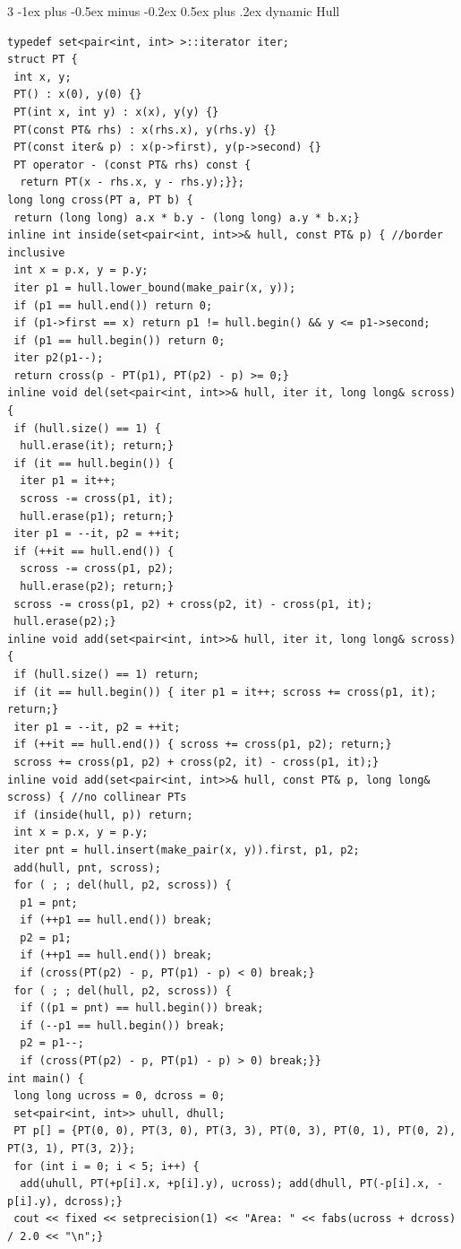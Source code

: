 \documentclass[8pt,a4paper,onesided]{article}
\makeatletter
\renewcommand{\subsection}{\@startsection{subsection}{2}{0mm}
    {-1ex plus -0.5ex minus -0.2ex} %
    {0.5ex plus .2ex}                %
    {\normalfont\large\bfseries}}    %
\makeatother
\begin{document}
\begin{multicols}{3}
\subsection{dynamic Hull}
\begin{verbatim}
typedef set<pair<int, int> >::iterator iter;
struct PT {
 int x, y;
 PT() : x(0), y(0) {}
 PT(int x, int y) : x(x), y(y) {}
 PT(const PT& rhs) : x(rhs.x), y(rhs.y) {}
 PT(const iter& p) : x(p->first), y(p->second) {}
 PT operator - (const PT& rhs) const {
  return PT(x - rhs.x, y - rhs.y);}};
long long cross(PT a, PT b) {
 return (long long) a.x * b.y - (long long) a.y * b.x;}
inline int inside(set<pair<int, int>>& hull, const PT& p) { //border inclusive
 int x = p.x, y = p.y;
 iter p1 = hull.lower_bound(make_pair(x, y));
 if (p1 == hull.end()) return 0;
 if (p1->first == x) return p1 != hull.begin() && y <= p1->second;
 if (p1 == hull.begin()) return 0;
 iter p2(p1--);
 return cross(p - PT(p1), PT(p2) - p) >= 0;}
inline void del(set<pair<int, int>>& hull, iter it, long long& scross) {
 if (hull.size() == 1) {
  hull.erase(it); return;}
 if (it == hull.begin()) {
  iter p1 = it++;
  scross -= cross(p1, it);
  hull.erase(p1); return;}
 iter p1 = --it, p2 = ++it;
 if (++it == hull.end()) {
  scross -= cross(p1, p2);
  hull.erase(p2); return;}
 scross -= cross(p1, p2) + cross(p2, it) - cross(p1, it);
 hull.erase(p2);}
inline void add(set<pair<int, int>>& hull, iter it, long long& scross) {
 if (hull.size() == 1) return;
 if (it == hull.begin()) { iter p1 = it++; scross += cross(p1, it); return;}
 iter p1 = --it, p2 = ++it;
 if (++it == hull.end()) { scross += cross(p1, p2); return;}
 scross += cross(p1, p2) + cross(p2, it) - cross(p1, it);}
inline void add(set<pair<int, int>>& hull, const PT& p, long long& scross) { //no collinear PTs
 if (inside(hull, p)) return;
 int x = p.x, y = p.y;
 iter pnt = hull.insert(make_pair(x, y)).first, p1, p2;
 add(hull, pnt, scross);
 for ( ; ; del(hull, p2, scross)) {
  p1 = pnt;
  if (++p1 == hull.end()) break;
  p2 = p1;
  if (++p1 == hull.end()) break;
  if (cross(PT(p2) - p, PT(p1) - p) < 0) break;}
 for ( ; ; del(hull, p2, scross)) {
  if ((p1 = pnt) == hull.begin()) break;
  if (--p1 == hull.begin()) break;
  p2 = p1--;
  if (cross(PT(p2) - p, PT(p1) - p) > 0) break;}}
int main() {
 long long ucross = 0, dcross = 0;
 set<pair<int, int>> uhull, dhull;
 PT p[] = {PT(0, 0), PT(3, 0), PT(3, 3), PT(0, 3), PT(0, 1), PT(0, 2), PT(3, 1), PT(3, 2)};
 for (int i = 0; i < 5; i++) {
  add(uhull, PT(+p[i].x, +p[i].y), ucross); add(dhull, PT(-p[i].x, -p[i].y), dcross);}
 cout << fixed << setprecision(1) << "Area: " << fabs(ucross + dcross) / 2.0 << "\n";}
\end{verbatim}

\end{multicols}
\end{document}
